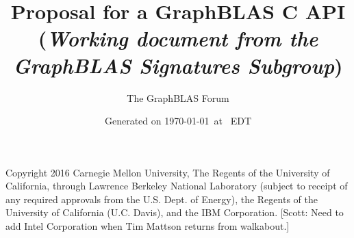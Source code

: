 \documentclass[11pt]{extarticle}
\begin{document}
\linenumbers

\title{Proposal for a GraphBLAS C API\\ (\emph{\large Working document from the \emph{GraphBLAS} Signatures Subgroup})}
\author{The GraphBLAS Forum}
\date{Generated on \today\ at \currenttime\ EDT}

\renewcommand{\vector}[1]{{\bf #1}}
\renewcommand{\matrix}[1]{{\bf #1}}
\newcommand{\zip}{{\mbox{zip}}}
\newcommand{\zap}{{\mbox{zap}}}
\newcommand{\ewiseadd}{{\mbox{\bf ewiseadd}}}
\newcommand{\ewisemult}{{\mbox{\bf ewisemult}}}
\newcommand{\mxm}{{\mbox{\bf mxm}}}
\newcommand{\vxm}{{\mbox{\bf vxm}}}
\newcommand{\mxv}{{\mbox{\bf mxv}}}
\newcommand{\gpit}[1]{{\sf #1}}
\newcommand{\ie}{\emph{i.e.}}
\newcommand{\eg}{\emph{e.g.}}
\newcommand{\nan}{{\sf NaN}}
\newcommand{\nil}{{\bf nil}}
\newcommand{\ifif}{{\bf if}}
\newcommand{\ifthen}{{\bf then}}
\newcommand{\ifelse}{{\bf else}}
\newcommand{\ifendif}{{\bf endif}}
\newcommand{\zero}{{\bf 0}}
\newcommand{\one}{{\bf 1}}
\newcommand{\true}{{\sf true}}
\newcommand{\false}{{\sf false}}

\newcommand{\aydin}[1]{{{\color{orange}[Aydin: #1]}}}
\newcommand{\scott}[1]{{{\color{violet}[Scott: #1]}}}
\newcommand{\tim}[1]{{{\color{teal}[Tim: #1]}}}
\newcommand{\jose}[1]{{{\color{red}[Jose: #1]}}}
\newcommand{\carl}[1]{{{\color{blue}[Carl: #1]}}}
\newcommand{\ajy}[1]{{{\color{brown}[Yzelman: #1]}}}


\renewcommand{\comment}[1]{{}}

\setlength{\parskip}{0.5\baselineskip}
\setlength{\parindent}{0ex}

\maketitle

\vfill

Copyright 2016 Carnegie Mellon University, The Regents of the University of California, through Lawrence Berkeley National Laboratory (subject to receipt of any required approvals from the U.S. Dept. of Energy), the Regents of the University of California (U.C. Davis), and the IBM Corporation. \scott{Need to add Intel Corporation when Tim Mattson returns from walkabout.}
\end{document}
